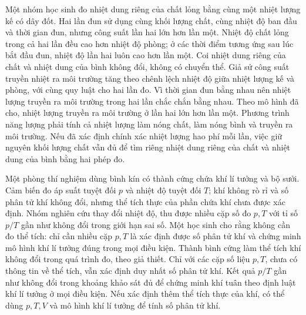 
\begin{ex}
Một nhóm học sinh đo nhiệt dung riêng của chất lỏng bằng cùng một nhiệt lượng kế có dây đốt. Hai lần đun sử dụng cùng khối lượng chất, cùng nhiệt độ ban đầu và thời gian đun, nhưng công suất lần hai lớn hơn lần một. Nhiệt độ chất lỏng trong cả hai lần đều cao hơn nhiệt độ phòng; ở các thời điểm tương ứng sau lúc bắt đầu đun, nhiệt độ lần hai luôn cao hơn lần một. Coi nhiệt dung riêng của chất và nhiệt dung của bình không đổi, không có chuyển thể. Giả sử công suất truyền nhiệt ra môi trường tăng theo chênh lệch nhiệt độ giữa nhiệt lượng kế và phòng, với cùng quy luật cho hai lần đo.
\choiceTF
{Vì thời gian đun bằng nhau nên nhiệt lượng truyền ra môi trường trong hai lần chắc chắn bằng nhau.}
{\True Theo mô hình đã cho, nhiệt lượng truyền ra môi trường ở lần hai lớn hơn lần một.}
{\True Phương trình năng lượng phải tính cả nhiệt lượng làm nóng chất, làm nóng bình và truyền ra môi trường.}
{Nếu đã xác định chính xác nhiệt lượng hao phí mỗi lần, việc giữ nguyên khối lượng chất vẫn đủ để tìm riêng nhiệt dung riêng của chất và nhiệt dung của bình bằng hai phép đo.}
\end{ex}

\begin{ex}
Một phòng thí nghiệm dùng bình kín có thành cứng chứa khí lí tưởng và bộ sưởi. Cảm biến đo áp suất tuyệt đối $p$ và nhiệt độ tuyệt đối $T$; khí không rò rỉ và số phân tử khí không đổi, nhưng thể tích thực của phần chứa khí chưa được xác định. Nhóm nghiên cứu thay đổi nhiệt độ, thu được nhiều cặp số đo $p,T$ với tỉ số $p/T$ gần như không đổi trong giới hạn sai số. Một học sinh cho rằng không cần đo thể tích: chỉ cần nhiều cặp $p,T$ là xác định được số phân tử khí và chứng minh mô hình khí lí tưởng đúng trong mọi điều kiện.
\choiceTF
{\True Thành bình cứng làm thể tích khí không đổi trong quá trình đo, theo giả thiết.}
{Chỉ với các cặp số liệu $p,T$, chưa có thông tin về thể tích, vẫn xác định duy nhất số phân tử khí.}
{Kết quả $p/T$ gần như không đổi trong khoảng khảo sát đủ để chứng minh khí tuân theo định luật khí lí tưởng ở mọi điều kiện.}
{\True Nếu xác định thêm thể tích thực của khí, có thể dùng $p,T,V$ và mô hình khí lí tưởng để tính số phân tử khí.}
\end{ex}
